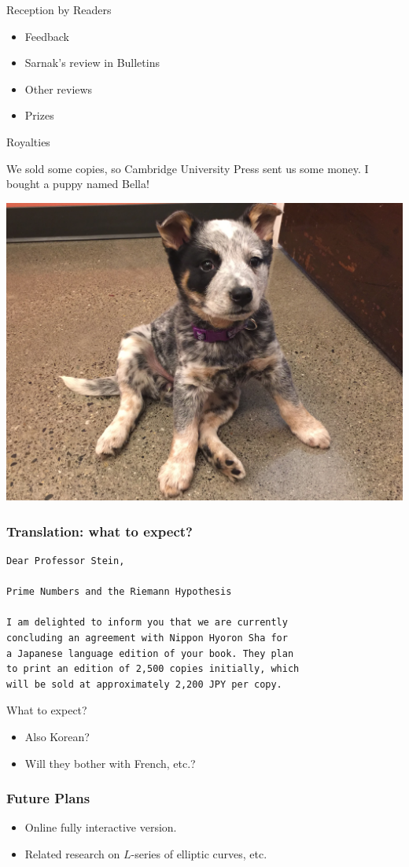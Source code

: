 \documentclass{beamer}
\begin{document}
\begin{frame}{Reception by Readers}
  \begin{itemize}
    \item Feedback
    \item Sarnak's review in Bulletins
    \item Other reviews
    \item Prizes
  \end{itemize}
\end{frame}

\begin{frame}{Royalties}

  We sold some copies, so Cambridge University Press sent us some money.
  I bought a puppy named Bella!

  \begin{center}
    \includegraphics[height=.7\textheight]{pics/bella-puppy.png}
  \end{center}


\end{frame}


\begin{frame}[fragile]
  \frametitle{Translation: what to expect?}
  \begin{verbatim}
Dear Professor Stein,

Prime Numbers and the Riemann Hypothesis

I am delighted to inform you that we are currently
concluding an agreement with Nippon Hyoron Sha for
a Japanese language edition of your book. They plan
to print an edition of 2,500 copies initially, which
will be sold at approximately 2,200 JPY per copy.
  \end{verbatim}

  What to expect?
  \begin{itemize}
    \item  Also Korean?
    \item  Will they bother with French, etc.?
  \end{itemize}
\end{frame}


\begin{frame}
  \frametitle{Future Plans}
  \begin{itemize}
    \item Online fully interactive version.
    \item Related research on $L$-series of elliptic curves, etc.
  \end{itemize}
\end{frame}
\end{document}
